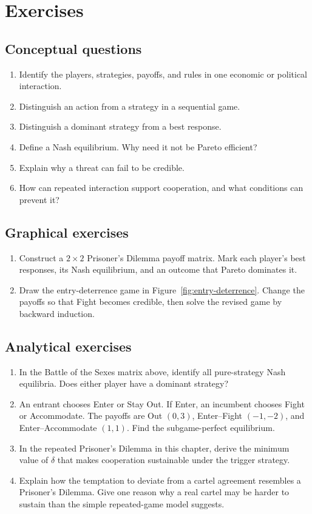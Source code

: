 \section*{Exercises}

\subsection*{Conceptual questions}
\begin{enumerate}[label=\arabic*.]
  \item Identify the players, strategies, payoffs, and rules in one economic or political interaction.
  \item Distinguish an action from a strategy in a sequential game.
  \item Distinguish a dominant strategy from a best response.
  \item Define a Nash equilibrium. Why need it not be Pareto efficient?
  \item Explain why a threat can fail to be credible.
  \item How can repeated interaction support cooperation, and what conditions can prevent it?
\end{enumerate}

\subsection*{Graphical exercises}
\begin{enumerate}[resume,label=\arabic*.]
  \item Construct a \(2\times2\) Prisoner's Dilemma payoff matrix. Mark each player's best responses, its Nash equilibrium, and an outcome that Pareto dominates it.
  \item Draw the entry-deterrence game in Figure~\ref{fig:entry-deterrence}. Change the payoffs so that Fight becomes credible, then solve the revised game by backward induction.
\end{enumerate}

\subsection*{Analytical exercises}
\begin{enumerate}[resume,label=\arabic*.]
  \item In the Battle of the Sexes matrix above, identify all pure-strategy Nash equilibria. Does either player have a dominant strategy?
  \item An entrant chooses Enter or Stay Out. If Enter, an incumbent chooses Fight or Accommodate. The payoffs are Out \((0,3)\), Enter--Fight \((-1,-2)\), and Enter--Accommodate \((1,1)\). Find the subgame-perfect equilibrium.
  \item In the repeated Prisoner's Dilemma in this chapter, derive the minimum value of \(\delta\) that makes cooperation sustainable under the trigger strategy.
  \item Explain how the temptation to deviate from a cartel agreement resembles a Prisoner's Dilemma. Give one reason why a real cartel may be harder to sustain than the simple repeated-game model suggests.
\end{enumerate}

